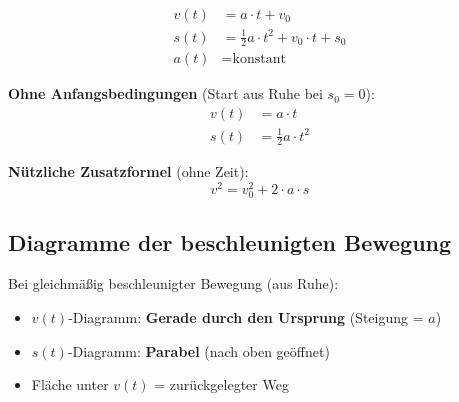 \documentclass[11pt,a4paper]{article}
\begin{document}
\begin{formelbox}
\begin{align}
v(t) &= a \cdot t + v_0 \tag{Geschwindigkeit}\\[0.3em]
s(t) &= \frac{1}{2} a \cdot t^2 + v_0 \cdot t + s_0 \tag{Weg}\\[0.3em]
a(t) &= \text{konstant} \tag{Beschleunigung}
\end{align}

\vspace{0.3cm}
\textbf{Ohne Anfangsbedingungen} (Start aus Ruhe bei $s_0 = 0$):
\begin{align}
v(t) &= a \cdot t \\
s(t) &= \frac{1}{2} a \cdot t^2
\end{align}

\textbf{Nützliche Zusatzformel} (ohne Zeit):
\[
v^2 = v_0^2 + 2 \cdot a \cdot s
\]
\end{formelbox}

\subsection{Diagramme der beschleunigten Bewegung}

\begin{center}
\end{center}

\begin{merksatz}
Bei gleichmäßig beschleunigter Bewegung (aus Ruhe):
\begin{itemize}
\item $v(t)$-Diagramm: \textbf{Gerade durch den Ursprung} (Steigung = $a$)
\item $s(t)$-Diagramm: \textbf{Parabel} (nach oben geöffnet)
\item Fläche unter $v(t)$ = zurückgelegter Weg
\end{itemize}
\end{merksatz}
\end{document}
